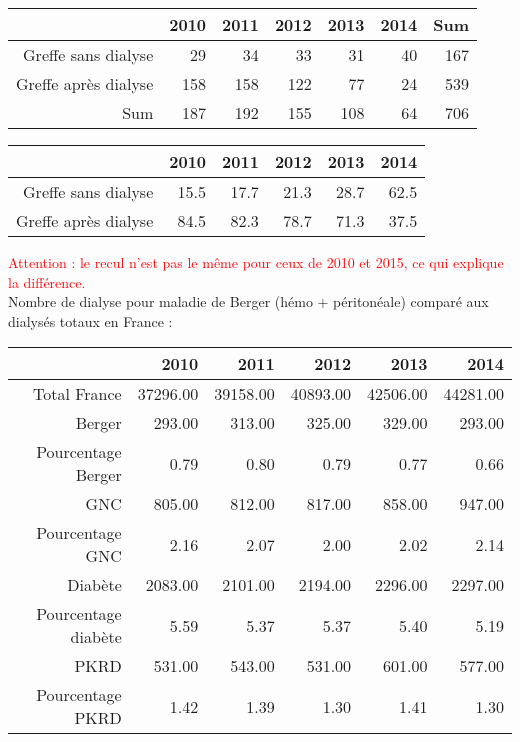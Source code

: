 \documentclass[11pt,a4paper]{article}\usepackage[]{graphicx}\usepackage[]{color}
\begin{document}
\begin{table}[H]
\centering
\begin{tabular}{rrrrrrr}
  \hline
 & 2010 & 2011 & 2012 & 2013 & 2014 & Sum \\ 
  \hline
Greffe sans dialyse & 29 & 34 & 33 & 31 & 40 & 167 \\ 
  Greffe après dialyse & 158 & 158 & 122 & 77 & 24 & 539 \\ 
  Sum & 187 & 192 & 155 & 108 & 64 & 706 \\ 
   \hline
\end{tabular}
\end{table}
\begin{table}[H]
\centering
\begin{tabular}{rrrrrr}
  \hline
 & 2010 & 2011 & 2012 & 2013 & 2014 \\ 
  \hline
Greffe sans dialyse & 15.5 & 17.7 & 21.3 & 28.7 & 62.5 \\ 
  Greffe après dialyse & 84.5 & 82.3 & 78.7 & 71.3 & 37.5 \\ 
   \hline
\end{tabular}
\end{table}


\textcolor{red}{Attention : le recul n'est pas le même pour ceux de 2010 et 2015, ce qui explique la différence.}
~\\

Nombre de dialyse pour maladie de Berger (hémo + péritonéale) comparé aux dialysés totaux en France :

\begin{table}[H]
\centering
\begin{tabular}{rrrrrr}
  \hline
 & 2010 & 2011 & 2012 & 2013 & 2014 \\ 
  \hline
Total France & 37296.00 & 39158.00 & 40893.00 & 42506.00 & 44281.00 \\ 
  Berger & 293.00 & 313.00 & 325.00 & 329.00 & 293.00 \\ 
  Pourcentage Berger & 0.79 & 0.80 & 0.79 & 0.77 & 0.66 \\ 
  GNC & 805.00 & 812.00 & 817.00 & 858.00 & 947.00 \\ 
  Pourcentage GNC & 2.16 & 2.07 & 2.00 & 2.02 & 2.14 \\ 
  Diabète & 2083.00 & 2101.00 & 2194.00 & 2296.00 & 2297.00 \\ 
  Pourcentage diabète & 5.59 & 5.37 & 5.37 & 5.40 & 5.19 \\ 
  PKRD & 531.00 & 543.00 & 531.00 & 601.00 & 577.00 \\ 
  Pourcentage PKRD & 1.42 & 1.39 & 1.30 & 1.41 & 1.30 \\ 
   \hline
\end{tabular}
\end{table}
\end{document}
